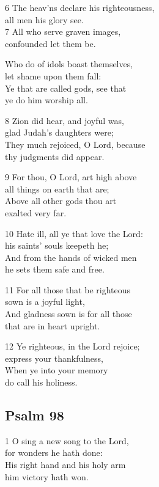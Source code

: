 6 The heav’ns declare his righteousness,\\
all men his glory see.\\
7 All who serve graven images,\\
confounded let them be.

Who do of idols boast themselves,\\
let shame upon them fall:\\
Ye that are called gods, see that\\
ye do him worship all.

8 Zion did hear, and joyful was,\\
glad Judah’s daughters were;\\
They much rejoiced, O Lord, because\\
thy judgments did appear.

9 For thou, O Lord, art high above\\
all things on earth that are;\\
Above all other gods thou art\\
exalted very far.

10 Hate ill, all ye that love the Lord:\\
his saints’ souls keepeth he;\\
And from the hands of wicked men\\
he sets them safe and free.

11 For all those that be righteous\\
sown is a joyful light,\\
And gladness sown is for all those\\
that are in heart upright.

12 Ye righteous, in the Lord rejoice;\\
express your thankfulness,\\
When ye into your memory\\
do call his holiness.

\begin{center}
\quad{}\quad{}
\end{center}


\subsection*{Psalm 98}

1 O sing a new song to the Lord,\\
for wonders he hath done:\\
His right hand and his holy arm\\
him victory hath won.

